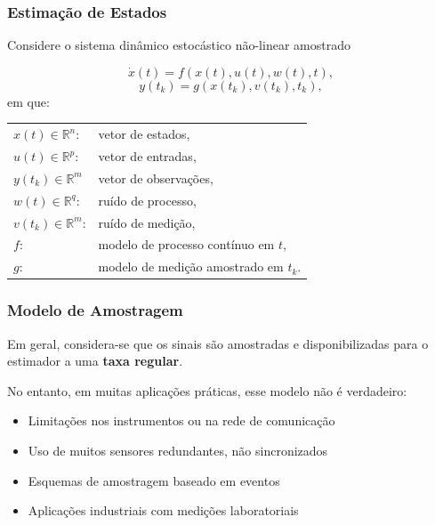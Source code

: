 \documentclass{beamer}
\renewcommand{\(}{\left(}
\renewcommand{\)}{\right)}
\renewcommand{\[}{\left[}
\renewcommand{\]}{\right]}
\begin{document}
\begin{frame}
\frametitle{Estimação de Estados}
Considere o sistema dinâmico estocástico não-linear amostrado

\begin{equation*}\label{eq:processo}
\dot{x}(t)=f(x(t),u(t),w(t),t),
\end{equation*}
\begin{equation*}\label{eq:obs}
y(t_k)=g(x(t_k),v(t_k),t_k),
\end{equation*}
\vspace{0.3cm}
em que:
\vspace{0.4cm}

\begin{tabular}{l l}
	\hfill
	$x(t) \in \mathbb{R}^n$:  	& vetor de estados, \\
	\hfill
	$u(t) \in \mathbb{R}^p$:  	& vetor de entradas, \\
	\hfill
	$y(t_k) \in \mathbb{R}^m$ 	& vetor de observações, \\
	\hfill
	$w(t) \in \mathbb{R}^q$:	 	& ruído de processo, \\
	\hfill
	$v(t_k) \in \mathbb{R}^m$: 	& ruído de medição, \\
	\hfill
	$f$: 		& modelo de processo contínuo em $t$, \\
	\hfill
	$g$:  	 	& modelo de medição amostrado em $t_k$.
\end{tabular}

\end{frame}


\begin{frame}
	\frametitle{Modelo de Amostragem}
	
	Em geral, considera-se que os sinais são amostradas e disponibilizadas para o estimador a uma \textbf{taxa regular}.
	
	\vspace{0.5cm}
	
	No entanto, em muitas aplicações práticas, esse modelo não é verdadeiro:
	
	\begin{itemize}
		\item<2-> Limitações nos instrumentos ou na rede de comunicação
		\item<3-> Uso de muitos sensores redundantes, não sincronizados	
		\item<4-> Esquemas de amostragem baseado em eventos
		\item<5-> Aplicações industriais com medições laboratoriais
	\end{itemize}

\end{frame}
\end{document}
